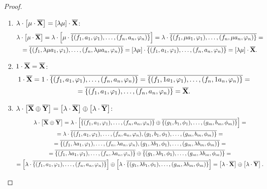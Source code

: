 \documentclass{article}
\theoremstyle{math}
\newcommand{\0}{\ensuremath{\vb{0}}}
\newcommand{\X}{\ensuremath{\vb{X}}}
\newcommand{\Y}{\ensuremath{\vb{Y}}}
\begin{document}
\begin{proof}
\begin{enumerate}
        \item $\lambda\cdot\left[\mu\cdot \overline{\X}\right]=[\lambda\mu]\cdot \overline{\X}$:
        \begin{multline*}
            \lambda\cdot\left[\mu\cdot \overline{\X}\right]=\lambda\cdot\left[\mu\cdot\overline{\{(f_1,a_1,\varphi_1),\ldots,(f_n,a_n,\varphi_n)\}}\right]=\lambda\cdot\overline{\{(f_1,\mu a_1,\varphi_1),\ldots,(f_n,\mu a_n,\varphi_n)\}}=\\=\overline{\{(f_1,\lambda\mu a_1,\varphi_1),\ldots,(f_n,\lambda\mu a_n,\varphi_n)\}}=[\lambda\mu]\cdot\overline{\{(f_1,a_1,\varphi_1),\ldots,(f_n,a_n,\varphi_n)\}}=[\lambda\mu]\cdot \overline{\X}.
        \end{multline*}
        \item $1\cdot \overline{\X}=\overline{\X}$:
        \begin{multline*}
            1\cdot\overline{\X}=1\cdot\overline{\{(f_1,a_1,\varphi_1),\ldots,(f_n,a_n,\varphi_n)\}}=\overline{\{(f_1,1a_1,\varphi_1),\ldots,(f_n,1a_n,\varphi_n)\}}=\\=\overline{\{(f_1,a_1,\varphi_1),\ldots,(f_n,a_n,\varphi_n)\}}=\overline{\X}.
        \end{multline*}
        \item $\lambda\cdot\left[\overline{\X}\oplus\overline{\Y}\right]=\left[\lambda\cdot \overline{\X}\right]\oplus\left[\lambda\cdot \overline{\Y}\right]$:
        \begin{multline*}
            \lambda\cdot\left[\overline{\X}\oplus \overline{\Y}\right]=\lambda\cdot\left[\overline{\{(f_1,a_1,\varphi_1),\ldots,(f_n,a_n,\varphi_n)\}}\oplus\overline{\{(g_1,b_1,\phi_1),\ldots,(g_m,b_m,\phi_m)\}}\right]=\\=\lambda\cdot\overline{\{(f_1, a_1,\varphi_1),\ldots,(f_n, a_n,\varphi_n),(g_1,b_1,\phi_1),\ldots,(g_m,b_m,\phi_m)\}}=\\=\overline{\{(f_1,\lambda a_1,\varphi_1),\ldots,(f_n,\lambda a_n,\varphi_n),(g_1,\lambda b_1,\phi_1),\ldots,(g_m,\lambda b_m,\phi_m)\}}=\\=\overline{\{(f_1,\lambda a_1,\varphi_1),\ldots,(f_n,\lambda a_n,\varphi_n)\}}\oplus\overline{\{(g_1,\lambda b_1,\phi_1),\ldots,(g_m,\lambda b_m,\phi_m)\}}=\\=\left[\lambda\cdot\overline{\{(f_1,a_1,\varphi_1),\ldots,(f_n,a_n,\varphi_n)\}}\right]\oplus\left[\lambda\cdot\overline{\{(g_1,\lambda b_1,\phi_1),\ldots,(g_m,\lambda b_m,\phi_m)\}}\right]=\left[\lambda\cdot \overline{\X}\right]\oplus\left[\lambda\cdot \overline{\Y}\right].
        \end{multline*}

\end{enumerate}
\end{proof}
\end{document}
